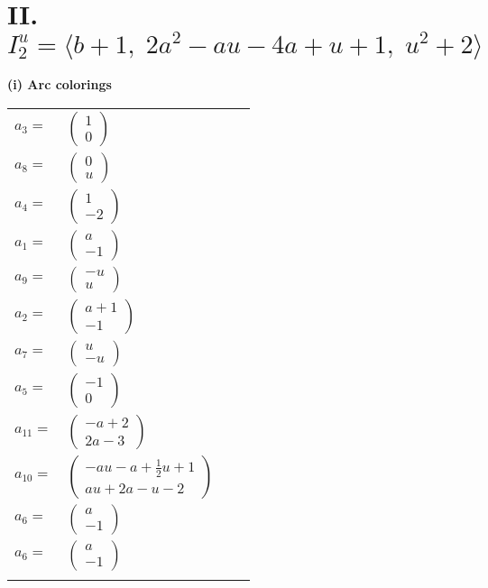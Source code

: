 \documentclass[1p]{elsarticle_modified}
\theoremstyle{definition}
\begin{document}
\centering \section*{II. $I^u_{2}= \langle b+1,\;2 a^2- a u-4 a+u+1,\;u^2+2 \rangle$}
\flushleft \textbf{(i) Arc colorings}\\
\begin{tabular}{m{7pt} m{180pt} m{7pt} m{180pt} }
\flushright $a_{3}=$&$\begin{pmatrix}1\\0\end{pmatrix}$ \\
\flushright $a_{8}=$&$\begin{pmatrix}0\\u\end{pmatrix}$ \\
\flushright $a_{4}=$&$\begin{pmatrix}1\\-2\end{pmatrix}$ \\
\flushright $a_{1}=$&$\begin{pmatrix}a\\-1\end{pmatrix}$ \\
\flushright $a_{9}=$&$\begin{pmatrix}- u\\u\end{pmatrix}$ \\
\flushright $a_{2}=$&$\begin{pmatrix}a+1\\-1\end{pmatrix}$ \\
\flushright $a_{7}=$&$\begin{pmatrix}u\\- u\end{pmatrix}$ \\
\flushright $a_{5}=$&$\begin{pmatrix}-1\\0\end{pmatrix}$ \\
\flushright $a_{11}=$&$\begin{pmatrix}- a+2\\2 a-3\end{pmatrix}$ \\
\flushright $a_{10}=$&$\begin{pmatrix}- a u- a+\frac{1}{2} u+1\\a u+2 a- u-2\end{pmatrix}$ \\
\flushright $a_{6}=$&$\begin{pmatrix}a\\-1\end{pmatrix}$\\ \flushright $a_{6}=$&$\begin{pmatrix}a\\-1\end{pmatrix}$\\&\end{tabular}
\end{document}
